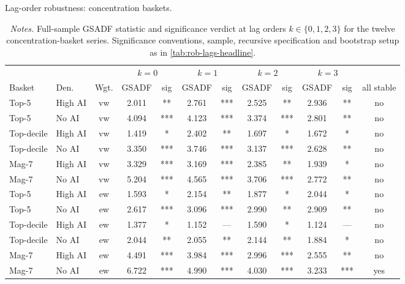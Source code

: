 \begin{table}[!htbp]
\centering
\caption{Lag-order robustness: concentration baskets.}
\label{tab:rob-lags-topn}
\small
\begin{tabular}{l l c S[table-format=1.3] c S[table-format=1.3] c S[table-format=1.3] c S[table-format=1.3] c c}
\toprule
 & & &  &  &  &  & \\
\cmidrule(lr){4-5}\cmidrule(lr){6-7}\cmidrule(lr){8-9}\cmidrule(lr){10-11}
Basket & Den. & Wgt. & {GSADF} & sig & {GSADF} & sig & {GSADF} & sig & {GSADF} & sig & all stable \\
\midrule
Top-5      & High AI & vw & 2.011 & **  & 2.761 & *** & 2.525 & **  & 2.936 & **  & no \\
Top-5      & No AI   & vw & 4.094 & *** & 4.123 & *** & 3.374 & *** & 2.801 & **  & no \\
Top-decile & High AI & vw & 1.419 & *   & 2.402 & **  & 1.697 & *   & 1.672 & *   & no \\
Top-decile & No AI   & vw & 3.350 & *** & 3.746 & *** & 3.137 & *** & 2.628 & **  & no \\
Mag-7      & High AI & vw & 3.329 & *** & 3.169 & *** & 2.385 & **  & 1.939 & *   & no \\
Mag-7      & No AI   & vw & 5.204 & *** & 4.565 & *** & 3.706 & *** & 2.772 & **  & no \\
\midrule
Top-5      & High AI & ew & 1.593 & *   & 2.154 & **  & 1.877 & *   & 2.044 & *   & no \\
Top-5      & No AI   & ew & 2.617 & *** & 3.096 & *** & 2.990 & **  & 2.909 & **  & no \\
Top-decile & High AI & ew & 1.377 & *   & 1.152 & --- & 1.590 & *   & 1.124 & --- & no \\
Top-decile & No AI   & ew & 2.044 & **  & 2.055 & **  & 2.144 & **  & 1.884 & *   & no \\
Mag-7      & High AI & ew & 4.491 & *** & 3.984 & *** & 2.996 & *** & 2.555 & **  & no \\
Mag-7      & No AI   & ew & 6.722 & *** & 4.990 & *** & 4.030 & *** & 3.233 & *** & yes \\
\bottomrule
\end{tabular}
\caption*{\footnotesize \textit{Notes.} Full-sample GSADF statistic and significance verdict at lag orders $k\in\{0,1,2,3\}$ for the twelve concentration-basket series. Significance conventions, sample, recursive specification and bootstrap setup as in \cref{tab:rob-lags-headline}.}
\end{table}
 
